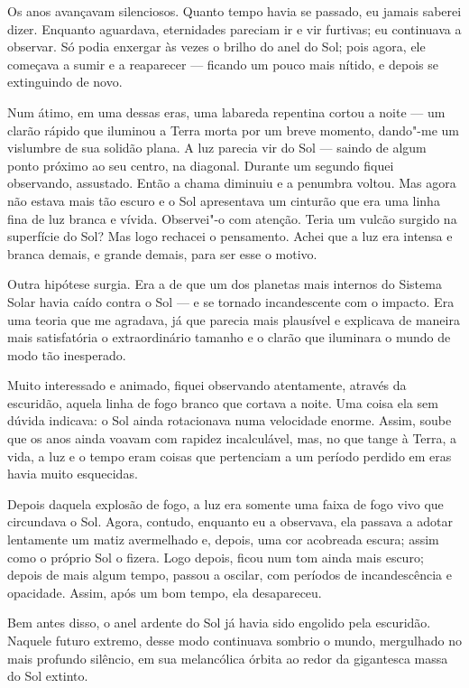 Os anos avançavam silenciosos. Quanto tempo havia se passado, eu jamais saberei dizer. Enquanto aguardava,
eternidades pareciam ir e vir furtivas; eu continuava a observar. Só podia enxergar às vezes o brilho do anel do
Sol; pois agora, ele começava a sumir e a reaparecer --- ficando um pouco mais nítido, e depois se extinguindo de novo.

Num átimo, em uma dessas eras, uma labareda repentina cortou a noite --- um clarão rápido que iluminou a Terra morta por
um breve momento, dando"-me um vislumbre de sua solidão plana. A luz parecia vir do Sol --- saindo de algum ponto próximo
ao seu centro, na diagonal. Durante um segundo fiquei observando, assustado. Então a chama diminuiu e a penumbra
voltou. Mas agora não estava mais tão escuro e o Sol apresentava um cinturão que era uma linha fina de luz branca e
vívida. Observei"-o com atenção. Teria um vulcão surgido na superfície do Sol? Mas logo rechacei o pensamento. Achei que
a luz era intensa e branca demais, e grande demais, para ser esse o motivo.

Outra hipótese surgia. Era a de que um dos planetas mais internos do Sistema Solar havia caído contra o Sol --- e se
tornado incandescente com o impacto. Era uma teoria que me agradava, já que parecia mais plausível e explicava de
maneira mais satisfatória o extraordinário tamanho e o clarão que iluminara o mundo de modo tão inesperado.

Muito interessado e animado, fiquei observando atentamente, através da escuridão, aquela linha de fogo branco que
cortava a noite. Uma coisa ela sem dúvida indicava: o Sol ainda rotacionava
numa velocidade enorme. Assim, soube
que os anos ainda voavam com rapidez incalculável, mas, no que tange à Terra, a vida, a luz e o tempo eram coisas que
pertenciam a um período perdido em eras havia muito esquecidas.

Depois daquela explosão de fogo, a luz era somente uma faixa de fogo vivo que circundava o Sol. Agora, contudo,
enquanto eu a observava, ela passava a adotar lentamente um matiz avermelhado e, depois, uma cor acobreada escura;
assim como o próprio Sol o fizera. Logo depois, ficou num tom ainda mais escuro; depois de mais algum tempo, passou
a oscilar, com períodos de incandescência e opacidade. Assim, após um bom tempo, ela desapareceu.

Bem antes disso, o anel ardente do Sol já havia sido engolido pela escuridão. Naquele futuro extremo, desse modo continuava
sombrio o mundo, mergulhado no mais profundo silêncio, em sua melancólica órbita ao redor da gigantesca massa do Sol
extinto.

